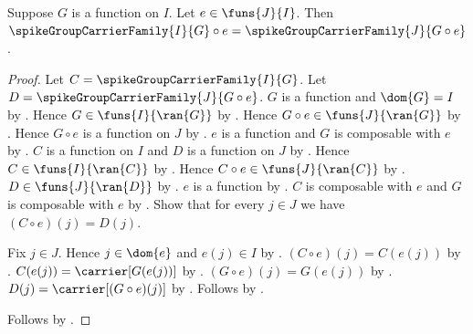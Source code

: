 \begin{proposition}\label{spike_pulled_back_group_carrier_family}
    Suppose $G$ is a function on $I$.
    Let $e\in\funs{J}{I}$.
    Then
        $\spikeGroupCarrierFamily{I}{G}\circ e
            =\spikeGroupCarrierFamily{J}{G\circ e}$.
\end{proposition}
\begin{proof}
    Let $C=\spikeGroupCarrierFamily{I}{G}$.
    Let $D=\spikeGroupCarrierFamily{J}{G\circ e}$.
    $G$ is a function and $\dom{G}=I$ by \auto.
    Hence $G\in\funs{I}{\ran{G}}$ by
        .
    Hence $G\circ e\in\funs{J}{\ran{G}}$ by .
    Hence $G\circ e$ is a function on $J$ by
        .
    $e$ is a function and $G$ is composable with $e$ by
        .
    $C$ is a function on $I$ and $D$ is a function on $J$ by
        .
    Hence $C\in\funs{I}{\ran{C}}$ by
        .
    Hence $C\circ e\in\funs{J}{\ran{C}}$ by .
    $D\in\funs{J}{\ran{D}}$ by
        .
    $e$ is a function by .
    $C$ is composable with $e$ and $G$ is composable with $e$ by
        .
    Show that for every $j\in J$ we have
        $(C\circ e)(j)=D(j)$.
    \begin{subproof}
        Fix $j\in J$.
        Hence $j\in\dom{e}$ and $e(j)\in I$ by
            .
        $(C\circ e)(j)=C(e(j))$ by .
        $C(e(j))=\carrier[G(e(j))]$ by
            .
        $(G\circ e)(j)=G(e(j))$ by .
        $D(j)=\carrier[(G\circ e)(j)]$ by
            .
        Follows by \auto.
    \end{subproof}
    Follows by .
\end{proof}

